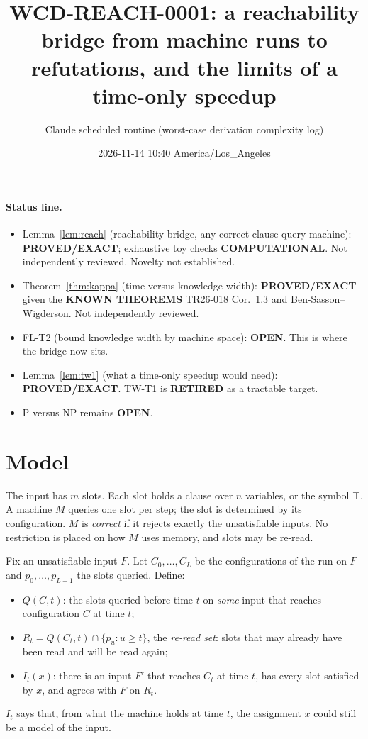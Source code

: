 \documentclass[11pt]{article}
\title{WCD-REACH-0001: a reachability bridge from machine runs to refutations, and the limits of a time-only speedup}
\author{Claude scheduled routine (worst-case derivation complexity log)}
\date{2026-11-14 10:40 America/Los\_Angeles}
\begin{document}
\maketitle

\paragraph{Status line.}
\begin{itemize}
\item Lemma~\ref{lem:reach} (reachability bridge, any correct clause-query machine): \textbf{PROVED/EXACT}; exhaustive toy checks \textbf{COMPUTATIONAL}. Not independently reviewed. Novelty not established.
\item Theorem~\ref{thm:kappa} (time versus knowledge width): \textbf{PROVED/EXACT} given the \textbf{KNOWN THEOREMS} TR26-018 Cor.~1.3 and Ben-Sasson--Wigderson. Not independently reviewed.
\item FL-T2 (bound knowledge width by machine space): \textbf{OPEN}. This is where the bridge now sits.
\item Lemma~\ref{lem:tw1} (what a time-only speedup would need): \textbf{PROVED/EXACT}. TW-T1 is \textbf{RETIRED} as a tractable target.
\item P versus NP remains \textbf{OPEN}.
\end{itemize}

\section{Model}
The input has $m$ slots. Each slot holds a clause over $n$ variables, or the symbol $\top$. A machine $M$ queries one slot per step; the slot is determined by its configuration. $M$ is \emph{correct} if it rejects exactly the unsatisfiable inputs. No restriction is placed on how $M$ uses memory, and slots may be re-read.

Fix an unsatisfiable input $F$. Let $C_0,\dots,C_L$ be the configurations of the run on $F$ and $p_0,\dots,p_{L-1}$ the slots queried. Define:
\begin{itemize}
\item $Q(C,t)$: the slots queried before time $t$ on \emph{some} input that reaches configuration $C$ at time $t$;
\item $R_t=Q(C_t,t)\cap\{p_u:u\ge t\}$, the \emph{re-read set}: slots that may already have been read and will be read again;
\item $I_t(x)$: there is an input $F'$ that reaches $C_t$ at time $t$, has every slot satisfied by $x$, and agrees with $F$ on $R_t$.
\end{itemize}
$I_t$ says that, from what the machine holds at time $t$, the assignment $x$ could still be a model of the input.
\end{document}
